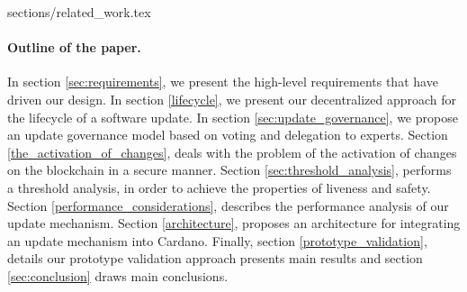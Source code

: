 {sections/related_work.tex}

\paragraph{Outline of the paper.} 
In section \ref{sec:requirements}, we present the high-level requirements that 
have driven our design. In section \ref{lifecycle}, we present our 
decentralized approach for the lifecycle of a software update. In section 
\ref{sec:update_governance}, we propose an update governance model based on 
voting and delegation to experts. Section \ref{the_activation_of_changes}, 
deals 
with the problem of the activation of changes on the blockchain in a secure 
manner. Section \ref{sec:threshold_analysis}, performs a threshold analysis, in 
order to achieve the properties of liveness and safety. Section 
\ref{performance_considerations}, describes the performance analysis of our 
update mechanism. Section \ref{architecture}, proposes an architecture for 
integrating an update mechanism into Cardano. Finally, section 
\ref{prototype_validation}, details our prototype validation approach presents 
main results and 
section \ref{sec:conclusion} draws main conclusions.